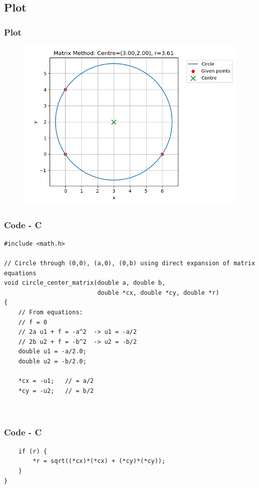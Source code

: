 \documentclass{beamer}
\theoremstyle{remark}
\numberwithin{equation}{section}
\begin{document}
\subsection{Plot}
\begin{frame}
    \frametitle{Plot}
\begin{figure}[H]
   \centering
   \includegraphics[width=0.8\columnwidth]{figs/newcentre.png}
   \caption{}
   \label{}
   \end{figure}
\end{frame}

\begin{frame}[fragile]
    \frametitle{Code - C}
    \begin{lstlisting}
#include <math.h>

// Circle through (0,0), (a,0), (0,b) using direct expansion of matrix equations
void circle_center_matrix(double a, double b,
                          double *cx, double *cy, double *r)
{
    // From equations:
    // f = 0
    // 2a u1 + f = -a^2  -> u1 = -a/2
    // 2b u2 + f = -b^2  -> u2 = -b/2
    double u1 = -a/2.0;
    double u2 = -b/2.0;

    *cx = -u1;   // = a/2
    *cy = -u2;   // = b/2



    \end{lstlisting}
    \end{frame}

    \begin{frame}[fragile]
    \frametitle{Code - C}
    \begin{lstlisting}
    if (r) {
        *r = sqrt((*cx)*(*cx) + (*cy)*(*cy));
    }
}




    \end{lstlisting}
    \end{frame}
\end{document}
